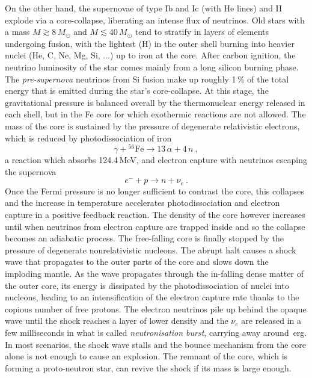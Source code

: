 On the other hand, the supernovae of type Ib and Ic (with He lines) and II explode via a core-collapse, %
liberating an intense flux of neutrinos.
Old stars with a mass $M \gtrsim 8\,M_\odot$ and $M \lesssim 40\,M_\odot$ tend to stratify %
in layers of elements undergoing fusion, with the lightest (H) in the outer shell burning into heavier nuclei %
(He, C, Ne, Mg, Si, ...) up to iron at the core.
After carbon ignition, the neutrino luminosity of the star comes mainly from a long silicon burning phase.
The \emph{pre-supernova} neutrinos from Si fusion make up roughly 1\,\% of the total energy that is emitted during the star's core-collapse.
At this stage, the gravitational pressure is balanced overall by the thermonuclear energy released in each shell, %
but in the Fe core for which exothermic reactions are not allowed.
The mass of the core is sustained by the pressure of degenerate relativistic electrons, %
which is reduced by photodissociation of iron 
\begin{equation}
	\gamma +  {}^{56}\text{Fe} \to 13\,\alpha + 4\,n \ ,
\end{equation}
a reaction which absorbs 124.4\,MeV, 
and electron capture with neutrinos escaping the supernova
\begin{equation}
	e^- + p \to n + \nu_e\ .
\end{equation}
Once the Fermi pressure is no longer sufficient to contrast the core, this collapses %
and the increase in temperature accelerates photodissociation and electron capture in a positive feedback reaction.
The density of the core however increases until when neutrinos from electron capture are trapped inside %
and so the collapse becomes an adiabatic process.
The free-falling core is finally stopped by the pressure of degenerate nonrelativistic nucleons.
The abrupt halt causes a shock wave that propagates to the outer parts of the core and slows down the imploding mantle.
As the wave propagates through the in-falling dense matter of the outer core,
its energy is dissipated by the photodissociation of nuclei into nucleons, %
leading to an intensification of the electron capture rate thanks to the copious number of free protons.
The electron neutrinos pile up behind the opaque wave until the shock reaches a layer of lower density 
and the $\nu_e$ are released in a few milliseconds in what is called \emph{neutronisation burst}, %
carrying away around \,erg.
In most scenarios, the shock wave stalls and the bounce mechanism from the core alone is not enough to cause an explosion.
The remnant of the core, which is forming a proto-neutron star, can revive the shock if its mass is large enough.
